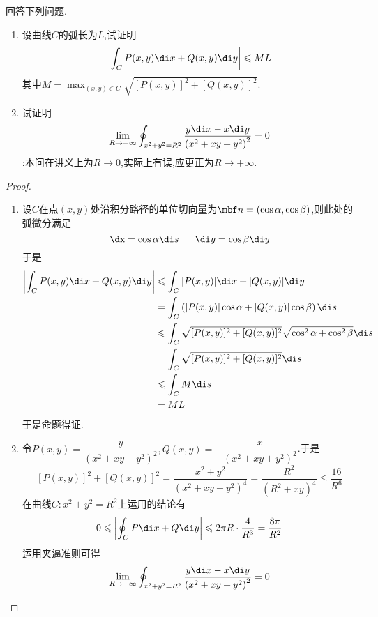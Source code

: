 \documentclass{ctexart}
\begin{document}
\begin{problem}[L.5.4]
    回答下列问题.
    \begin{enumerate}[label=\tbf{(\arabic*)}]
        \item 设曲线$C$的弧长为$L$,试证明
            \[\left|\int_CP(x,y)\di x+Q(x,y)\di y\right|\leqslant ML\]
            其中$\displaystyle M=\max_{(x,y)\in C}\sqrt{[P(x,y)]^2+[Q(x,y)]^2}$.
        \item 试证明
            \[\lim_{R\to+\infty}\oint_{x^2+y^2=R^2}\dfrac{y\di x-x\di y}{\left(x^2+xy+y^2\right)^2}=0\]
            :本问在讲义上为$R\to0$,实际上有误,应更正为$R\to+\infty$.
    \end{enumerate}
\end{problem}
\begin{proof}
    \begin{enumerate}[label=\tbf{(\arabic*)}]
        \item 设$C$在点$(x,y)$处沿积分路径的单位切向量为$\mbf n=(\cos\alpha,\cos\beta)$,则此处的弧微分满足
            \[\dx=\cos\alpha\di s\ \ \ \ \ \di y=\cos\beta\di y\]
            于是
            \[\begin{aligned}
                \left|\int_CP(x,y)\di x+Q(x,y)\di y\right|
                &\leqslant \int_C|P(x,y)|\di x+|Q(x,y)|\di y \\
                &= \int_C\left(|P(x,y)|\cos\alpha+|Q(x,y)|\cos\beta\right)\di s \\
                &\leqslant\int_C\sqrt{[P(x,y)]^2+[Q(x,y)]^2}\sqrt{\cos^2\alpha+\cos^2\beta}\di s \\
                &= \int_C\sqrt{[P(x,y)]^2+[Q(x,y)]^2}\di s \\
                &\leqslant \int_CM\di s \\
                &= ML
            \end{aligned}\]
            于是命题得证.
        \item 令$P(x,y)=\dfrac{y}{\left(x^2+xy+y^2\right)^2},Q(x,y)=-\dfrac{x}{\left(x^2+xy+y^2\right)^2}$.于是
            \[[P(x,y)]^2+[Q(x,y)]^2=\dfrac{x^2+y^2}{\left(x^2+xy+y^2\right)^4}=\dfrac{R^2}{\left(R^2+xy\right)^4}\leqslant\dfrac{16}{R^6}\]
            在曲线$C:x^2+y^2=R^2$上运用的结论有
            \[0\leqslant\left|\oint_CP\di x+Q\di y\right|\leqslant 2\pi R\cdot\dfrac{4}{R^3}=\dfrac{8\pi}{R^2}\]
            运用夹逼准则可得
            \[\lim_{R\to+\infty}\oint_{x^2+y^2=R^2}\dfrac{y\di x-x\di y}{\left(x^2+xy+y^2\right)^2}=0\]
    \end{enumerate}
\end{proof}
\end{document}
